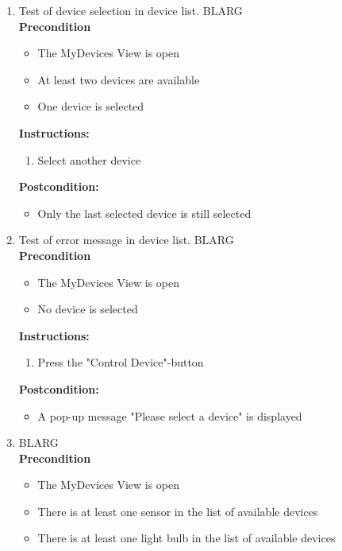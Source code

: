 \documentclass[a4paper]{article}
\newlength{\testlabellength}
\newenvironment{testlist}{\begin{enumerate}[label=\bfseries Instruction \thesubsection.\arabic* , labelindent=0pt, labelwidth=\testlabellength , leftmargin=2cm]}{\end{enumerate}}
\newenvironment{precondition}{
{\color{white}BLARG}\\ 
\textbf{Precondition}
\begin{itemize}[labelindent=0cm, labelwidth=2cm , leftmargin=1cm]
}
{\end{itemize}}
\newenvironment{instruction}{
\textbf{Instructions:}
\begin{enumerate}[label=\bfseries  \arabic*., labelindent=0cm, labelwidth=2cm , leftmargin=1cm]
}
{\end{enumerate}}
\newenvironment{postcondition}{
\textbf{Postcondition:}
\begin{itemize}[labelindent=0cm, labelwidth=2cm , leftmargin=1cm]
}
{\end{itemize}}
\begin{document}
\begin{appendices}
\begin{testlist}
    \item Test of device selection in device list.
   		\begin{precondition}
   			\item The MyDevices View is open
   			\item At least two devices are available
   			\item One device is selected
   		\end{precondition}
   		\begin{instruction}
   			\item Select another device
   		\end{instruction}
   		\begin{postcondition}
   			\item Only the last selected device is still selected
   		\end{postcondition}
    
    \item Test of error message in device list.
    	\begin{precondition}
    		\item The MyDevices View is open
    		\item No device is selected
    	\end{precondition}
    	\begin{instruction}
    		\item Press the "Control Device"-button
    	\end{instruction}
    	\begin{postcondition}
    		\item A pop-up message "Please select a device" is displayed
    	\end{postcondition}
    
	\item \label{MyDevicesTest2}
		\begin{precondition}
			\item The MyDevices View is open
			\item There is at least one sensor in the list of available devices
			\item There is at least one light bulb in the list of available devices
		\end{precondition}
			

\end{testlist}
\end{appendices}
\end{document}
